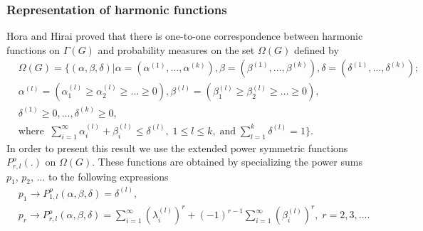 \documentclass[12pt]{amsart}
\theoremstyle{definition}
\numberwithin{equation}{section}
\begin{document}
\subsubsection{Representation of harmonic functions}
Hora and Hirai \cite{HoraHirai} proved that there is
one-to-one correspondence between harmonic functions on $\Gamma\left(G\right)$ and probability measures on the set $\Omega\left(G\right)$ defined by
\begin{equation}\label{3.3.1.Thoma}
\begin{split}
&\Omega(G)=\biggl\{(\alpha,\beta,\delta)\biggr|
\alpha=\left(\alpha^{(1)},\ldots,\alpha^{(k)}\right),\beta=\left(\beta^{(1)},\ldots,\beta^{(k)}\right),
\delta=\left(\delta^{(1)},\ldots,\delta^{(k)}\right);\\
&\alpha^{(l)}=\left(\alpha_1^{(l)}\geq\alpha_2^{(l)}\geq\ldots\geq 0\right), \beta^{(l)}=\left(\beta_1^{(l)}\geq\beta_2^{(l)}\geq\ldots\geq 0\right),\\
&\delta^{(1)}\geq 0,\ldots,\delta^{(k)}\geq 0,\\
&\mbox{where}\;\;
\sum\limits_{i=1}^{\infty}\alpha_i^{(l)}+\beta_i^{(l)}\leq\delta^{(l)},\; 1\leq l\leq k,\;\mbox{and}\;\sum\limits_{l=1}^k\delta^{(l)}=1\biggl\}.
\end{split}
\end{equation}
In order to present this result we use the extended power symmetric functions $P_{r,l}^{o}\left(.\right)$ on $\Omega\left(G\right)$. These functions are obtained by specializing the power sums $p_1$, $p_2$, $\ldots$ to the following expressions
\begin{equation}\label{3.3.2.PowerSums}
\begin{split}
&p_1\longrightarrow P^{o}_{1,l}\left(\alpha,\beta,\delta\right)=\delta^{(l)},\\
&p_r\longrightarrow P^{o}_{r,l}\left(\alpha,\beta,\delta\right)
=\sum\limits_{i=1}^{\infty}\left(\lambda_i^{(l)}\right)^r+(-1)^{r-1}
\sum\limits_{i=1}^{\infty}\left(\beta_i^{(l)}\right)^r,\; r=2,3,\ldots .
\end{split}
\end{equation}
\end{document}
